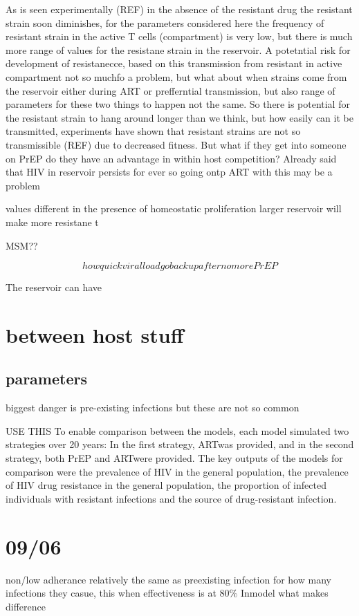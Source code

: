 \documentclass[DIV=15]{scrartcl}
\begin{document}
As is seen experimentally (REF) in the absence of the resistant drug the resistant strain soon diminishes,  for the parameters considered here the frequency of resistant strain in the active T cells (compartment) is very low, but there is much more range of values for the resistane strain in the reservoir. A potetntial risk for development 
of resistanecce, based on this transmission from resistant in active compartment not so muchfo a problem,  but what about when strains come from the reservoir either during ART or prefferntial transmission, but also  range of parameters for these two things to happen not the same. So there is potential for the resistant strain to hang around longer than we think, but how easily can it be transmitted, experiments have shown that resistant strains are not so transmissible (REF) due to decreased fitness.  But what if they get into someone on PrEP do they have an advantage in within host competition? Already said that HIV in reservoir persists for ever so going ontp ART with this may be a problem

values different in the presence of  homeostatic proliferation larger reservoir will make more resistane t


MSM??




$$how quick viral load go back up after no more PrEP$$

The reservoir can have 


\section{between host stuff}
   \subsection{parameters}
biggest danger is pre-existing infections but these are not so common


  
USE THIS
To enable comparison between the models, each model
simulated two strategies over 20 years: In the first strategy,
ARTwas provided, and in the second strategy, both PrEP
and ARTwere provided. The key outputs of the models
for comparison were the prevalence of HIV in the general
population, the prevalence of HIV drug resistance in
the general population, the proportion of infected
individuals with resistant infections and the source of
drug-resistant infection.


\section{09/06}
non/low adherance relatively the same as preexisting infection for how many infections they casue, this when effectiveness is at $ 80\%$
Inmodel what makes difference 
\end{document}
